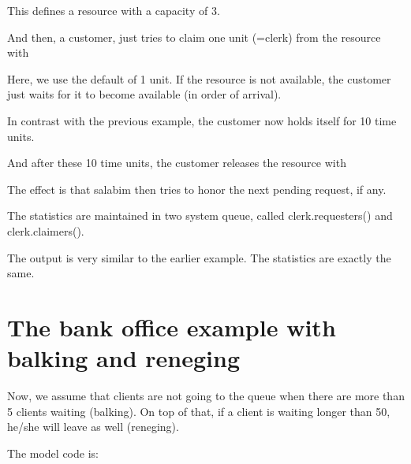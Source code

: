\documentclass[letterpaper,10pt,english]{sphinxmanual}
\begin{document}
This defines a resource with a capacity of 3.

And then, a customer, just tries to claim one unit (=clerk) from the resource with

\begin{sphinxVerbatim}[commandchars=\\\{\}]
 
\end{sphinxVerbatim}

Here, we use the default of 1 unit. If the resource is not available, the customer just
waits for it to become available (in order of arrival).

In contrast with the previous example, the customer now holds itself for 10 time units.

And after these 10 time units, the customer releases the resource with

\begin{sphinxVerbatim}[commandchars=\\\{\}]
\end{sphinxVerbatim}

The effect is that salabim then tries to honor the next pending request, if any.


The statistics are maintained in two system queue, called clerk.requesters() and clerk.claimers().

The output is very similar to the earlier example. The statistics are exactly the same.


\section{The bank office example with balking and reneging}
\label{\detokenize{Modeling:the-bank-office-example-with-balking-and-reneging}}
Now, we assume that clients are not going to the queue when there are more than 5 clients
waiting (balking). On top of that, if a client is waiting longer than 50, he/she will
leave as well (reneging).

The model code is:
\end{document}
